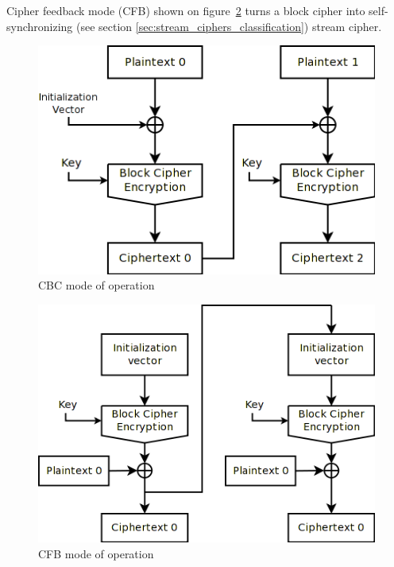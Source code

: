 Cipher feedback mode (CFB) shown on figure~\ref{fig:mode-cfb} turns a block
cipher into self-synchronizing
(see section \ref{sec:stream_ciphers_classification}) stream cipher.
\begin{figure}[htbp]
	\centering
	\includegraphics[scale=0.6]{images/modes_cbc}
	\caption{CBC mode of operation}
	\label{fig:mode-cbc}
\end{figure}
\begin{figure}[htbp]
	\centering
	\includegraphics[scale=0.6]{images/modes_cfb}
	\caption{CFB mode of operation}
	\label{fig:mode-cfb}
\end{figure}


